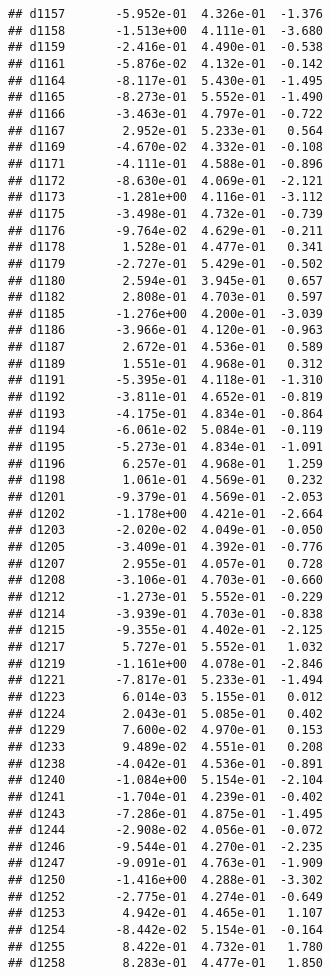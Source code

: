 \documentclass[
]{article}
\begin{document}
\begin{verbatim}
## d1157       -5.952e-01  4.326e-01  -1.376
## d1158       -1.513e+00  4.111e-01  -3.680
## d1159       -2.416e-01  4.490e-01  -0.538
## d1161       -5.876e-02  4.132e-01  -0.142
## d1164       -8.117e-01  5.430e-01  -1.495
## d1165       -8.273e-01  5.552e-01  -1.490
## d1166       -3.463e-01  4.797e-01  -0.722
## d1167        2.952e-01  5.233e-01   0.564
## d1169       -4.670e-02  4.332e-01  -0.108
## d1171       -4.111e-01  4.588e-01  -0.896
## d1172       -8.630e-01  4.069e-01  -2.121
## d1173       -1.281e+00  4.116e-01  -3.112
## d1175       -3.498e-01  4.732e-01  -0.739
## d1176       -9.764e-02  4.629e-01  -0.211
## d1178        1.528e-01  4.477e-01   0.341
## d1179       -2.727e-01  5.429e-01  -0.502
## d1180        2.594e-01  3.945e-01   0.657
## d1182        2.808e-01  4.703e-01   0.597
## d1185       -1.276e+00  4.200e-01  -3.039
## d1186       -3.966e-01  4.120e-01  -0.963
## d1187        2.672e-01  4.536e-01   0.589
## d1189        1.551e-01  4.968e-01   0.312
## d1191       -5.395e-01  4.118e-01  -1.310
## d1192       -3.811e-01  4.652e-01  -0.819
## d1193       -4.175e-01  4.834e-01  -0.864
## d1194       -6.061e-02  5.084e-01  -0.119
## d1195       -5.273e-01  4.834e-01  -1.091
## d1196        6.257e-01  4.968e-01   1.259
## d1198        1.061e-01  4.569e-01   0.232
## d1201       -9.379e-01  4.569e-01  -2.053
## d1202       -1.178e+00  4.421e-01  -2.664
## d1203       -2.020e-02  4.049e-01  -0.050
## d1205       -3.409e-01  4.392e-01  -0.776
## d1207        2.955e-01  4.057e-01   0.728
## d1208       -3.106e-01  4.703e-01  -0.660
## d1212       -1.273e-01  5.552e-01  -0.229
## d1214       -3.939e-01  4.703e-01  -0.838
## d1215       -9.355e-01  4.402e-01  -2.125
## d1217        5.727e-01  5.552e-01   1.032
## d1219       -1.161e+00  4.078e-01  -2.846
## d1221       -7.817e-01  5.233e-01  -1.494
## d1223        6.014e-03  5.155e-01   0.012
## d1224        2.043e-01  5.085e-01   0.402
## d1229        7.600e-02  4.970e-01   0.153
## d1233        9.489e-02  4.551e-01   0.208
## d1238       -4.042e-01  4.536e-01  -0.891
## d1240       -1.084e+00  5.154e-01  -2.104
## d1241       -1.704e-01  4.239e-01  -0.402
## d1243       -7.286e-01  4.875e-01  -1.495
## d1244       -2.908e-02  4.056e-01  -0.072
## d1246       -9.544e-01  4.270e-01  -2.235
## d1247       -9.091e-01  4.763e-01  -1.909
## d1250       -1.416e+00  4.288e-01  -3.302
## d1252       -2.775e-01  4.274e-01  -0.649
## d1253        4.942e-01  4.465e-01   1.107
## d1254       -8.442e-02  5.154e-01  -0.164
## d1255        8.422e-01  4.732e-01   1.780
## d1258        8.283e-01  4.477e-01   1.850

\end{verbatim}
\end{document}
